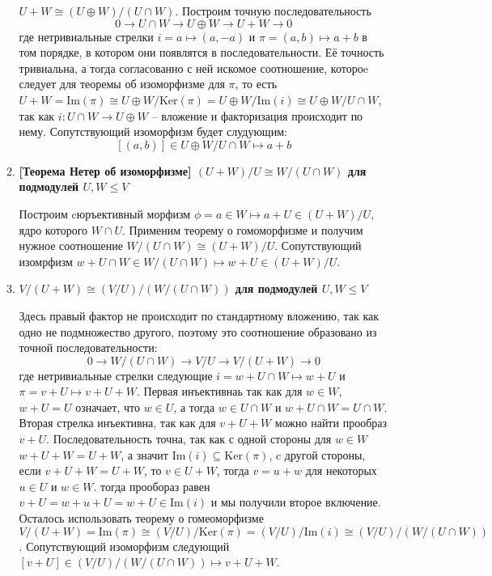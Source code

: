 \documentclass{article}
\begin{document}
\begin{enumerate}
\begin{enumerate}
                $U+W\cong (U\oplus W)/(U\cap W)$. Построим точную последовательность
                \[
                    0\rightarrow U\cap W\rightarrow U\oplus W\rightarrow U+W\rightarrow 0
                \]
                где нетривиальные стрелки $i=a\mapsto (a,-a)$ и $\pi=(a,b)\mapsto a+b$ в том порядке, в котором они появлятся
                в последовательности. Её точность тривиальна, а тогда согласованно с ней искомое соотношение, котороe
                следует для теоремы об изоморфизме для $\pi$, то есть $U+W=\text{Im}(\pi)\cong U\oplus W/\text{Ker}(\pi)
                = U\oplus W/\text{Im}(i)\cong U\oplus W/U\cap W$, так как $i : U\cap W\rightarrow U\oplus W$ – вложение и
                факторизация происходит по нему. Сопутствующий изоморфизм будет слудующим:
                \[[(a,b)]\in U\oplus W/U\cap W \mapsto a+b\]

            \item \textbf{[Теорема Нетер об изоморфизме] $(U+W)/U\cong W/(U\cap W)$ для подмодулей $U,W\leq V$}

                Построим cюръективный морфизм $\phi = a\in W\mapsto a+U\in(U+W)/U$, ядро которого $W\cap U$. Применим
                теорему о гомоморфизме и получим нужное соотношение $W/(U\cap W)\cong (U+W)/U$. Сопутствующий изомрфизм
                $w+U\cap W\in W/(U\cap W)\mapsto w+U\in (U+W)/U$.

            \item \textbf{$V/(U+W)\cong (V/U)/(W/(U\cap W))$ для подмодулей $U,W\leq V$}

                Здесь правый фактор не происходит по стандартному вложению, так как одно не подмножество другого,
                поэтому это соотношение образовано из точной последовательности:
                \[0\rightarrow W/(U\cap W)\rightarrow V/U\rightarrow V/(U+W)\rightarrow 0\]
                где нетривиальные стрелки следующие $i=w+U\cap W\mapsto w+U$ и $\pi=v+U\mapsto v+U+W$. Первая
                инъективнаь так как для $w\in W$, $w+U=U$ означает, что $w\in U$, а тогда $w\in U\cap W$ и $w+U\cap W=
                U\cap W$. Вторая стрелка инъективна, так как для $v+U+W$ можно найти прообраз $v+U$. Последовательность
                точна, так как с одной стороны для $w\in W$ $w+U+W=U+W$, а значит $\text{Im}(i)\subseteq\text{Ker}(\pi)$,
                c другой стороны, если $v+U+W=U+W$, то $v\in U+W$, тогда $v=u+w$ для некоторых $u\in U$ и $w\in W$.
                тогда прообораз равен $v+U=w+u+U=w+U\in\text{Im}(i)$ и мы получили второе включение. Осталось использовать
                теорему о гомеоморфизме $V/(U+W)=\text{Im}(\pi)\cong(V/U)/\text{Ker}(\pi)=(V/U)/\text{Im}(i)\cong(V/U)/(W/(U\cap W))$.
                Сопутствующий изоморфизм следующий $[v+U]\in(V/U)/(W/(U\cap W))\mapsto v+U+W$. 


\end{enumerate}
\end{enumerate}
\end{document}
